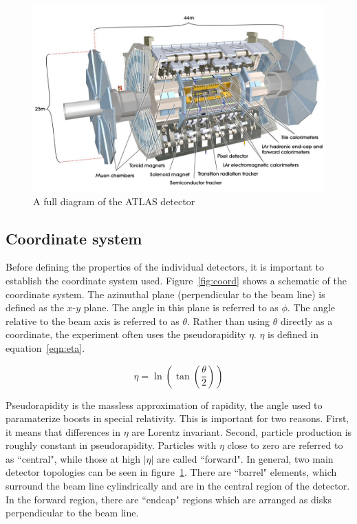 \begin{figure}[h!]
  \centering
  \captionsetup{justification=centering}

  \includegraphics[width=\textwidth]{figures/ATLAS}
   \caption{A full diagram of the ATLAS detector~\cite{ATLASPaper}}
  \label{fig:ATLAS_overview}
\end{figure}

\subsection{Coordinate system}

Before defining the properties of the individual detectors, it is important to establish the coordinate system used. Figure~\ref{fig:coord} shows a schematic of the coordinate system. The azimuthal plane (perpendicular to the beam line) is defined as the $x$-$y$ plane. The angle in this plane is referred to as $\phi$. The angle relative to the beam axis is referred to as $\theta$. Rather than using $\theta$ directly as a coordinate, the experiment often uses the pseudorapidity $\eta$. $\eta$ is defined in equation~\ref{eqn:eta}. 

\begin{equation}
\label{eqn:eta}
\eta = \ln{\left(\tan\left(\frac{\theta}{2}\right)\right)}
\end{equation}

Pseudorapidity is the massless approximation of rapidity, the angle used to paramaterize boosts in special relativity. This is important for two reasons. First, it means that differences in $\eta$ are Lorentz invariant. Second, particle production is roughly constant in pseudorapidity. Particles with $\eta$ close to zero are referred to as ``central", while those at high $|\eta|$ are called ``forward". In general, two main detector topologies can be seen in figure~\ref{fig:ATLAS_overview}. There are ``barrel" elements, which surround the beam line cylindrically and are in the central region of the detector. In the forward region, there are ``endcap" regions which are arranged as disks perpendicular to the beam line. 

